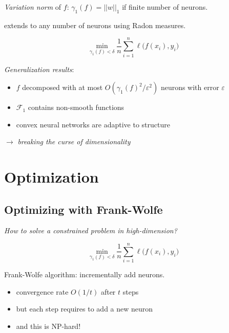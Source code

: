 \documentclass{beamer}
\begin{document}
\begin{frame}{\subsecname}

\textit{Variation norm} of $f$: $\gamma_1(f)=||w||_1$ if finite number of neurons.

extends to any number of neurons using Radon measures.

$$\min_{\gamma_1(f) < \delta}  \frac{1}{n} \sum_{i=1}^n \ell \big(f(x_i), y_i \big)$$

\vspace{1em}

\textit{Generalization results}:

\begin{itemize}

\item $f$ decomposed with at most $O(\gamma_1(f)^2/\varepsilon^2)$ neurons with error $\varepsilon$

\item $\mathcal{F}_1$ contains non-smooth functions

\item convex neural networks are adaptive to structure

\end{itemize}

\hspace{3em}$\rightarrow$ \textit{breaking the curse of dimensionality}





\end{frame}


\section{Optimization}


\subsection{Optimizing with Frank-Wolfe}

\begin{frame}{\subsecname}



\textit{How to solve a constrained problem in high-dimension?}

$$\min_{\gamma_1(f) < \delta}  \frac{1}{n} \sum_{i=1}^n \ell \big(f(x_i), y_i \big)$$

\vspace{2em}

Frank-Wolfe algorithm: incrementally add neurons.

\begin{itemize}

\item convergence rate $O(1/t)$ after $t$ steps

\item but each step requires to add a new neuron

\item and this is NP-hard!

\end{itemize}

\end{frame}
\end{document}
